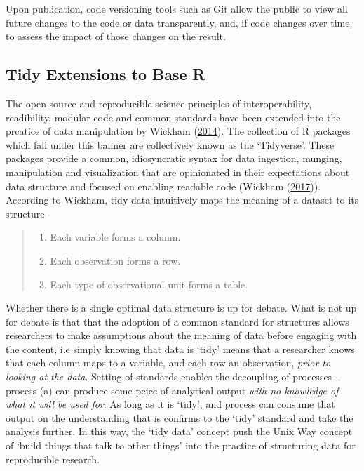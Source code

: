 \documentclass[11pt,preprint, authoryear]{elsarticle}
\numberwithin{equation}{section}
\numberwithin{figure}{section}
\numberwithin{table}{section}
\def\tightlist{} %
\begin{document}
Upon publication, code versioning tools such as Git allow the public to
view all future changes to the code or data transparently, and, if code
changes over time, to assess the impact of those changes on the result.

\subsection{Tidy Extensions to Base R}\label{tidy-extensions-to-base-r}

The open source and reproducible science principles of interoperability,
readibility, modular code and common standards have been extended into
the prcatice of data manipulation by Wickham
(\protect\hyperlink{ref-Wickham2014}{2014}). The collection of R
packages which fall under this banner are collectively known as the
`Tidyverse'. These packages provide a common, idiosyncratic syntax for
data ingestion, munging, manipulation and visualization that are
opinionated in their expectations about data structure and focused on
enabling readable code (Wickham
(\protect\hyperlink{ref-Wickham2017}{2017})). According to Wickham, tidy
data intuitively maps the meaning of a dataset to its structure -

\begin{quote}
\begin{enumerate}
\def\labelenumi{\arabic{enumi}.}
\tightlist
\item
  Each variable forms a column.
\item
  Each observation forms a row.
\item
  Each type of observational unit forms a table.
\end{enumerate}
\end{quote}

Whether there is a single optimal data structure is up for debate. What
is not up for debate is that that the adoption of a common standard for
structures allows researchers to make assumptions about the meaning of
data before engaging with the content, i.e simply knowing that data is
`tidy' means that a researcher knows that each column maps to a
variable, and each row an observation, \emph{prior to looking at the
data}. Setting of standards enables the decoupling of processes -
process (a) can produce some peice of analytical output \emph{with no
knowledge of what it will be used for}. As long as it is `tidy', and
process can consume that output on the understanding that is confirms to
the `tidy' standard and take the analysis further. In this way, the
`tidy data' concept push the Unix Way concept of `build things that talk
to other things' into the practice of structuring data for reproducible
research.
\end{document}
